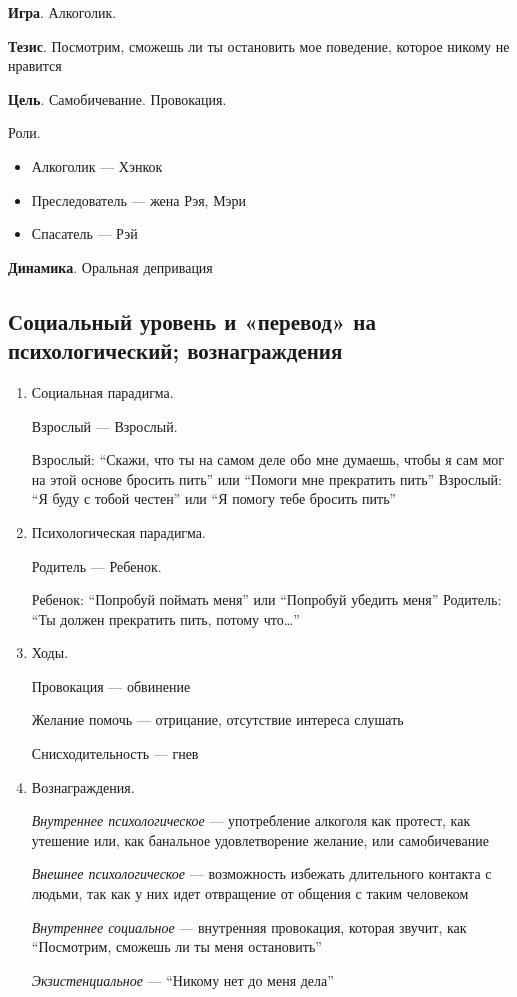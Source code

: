 \textbf{Игра}. Алкоголик.

\textbf{Тезис}. Посмотрим, сможешь ли ты остановить мое поведение, которое никому не нравится

\textbf{Цель}. Самобичевание. Провокация.

Роли.
\begin{itemize}
    \item Алкоголик — Хэнкок
    \item Преследователь — жена Рэя, Мэри
    \item Спасатель — Рэй
\end{itemize}

\textbf{Динамика}. Оральная депривация

\subsection*{Социальный уровень и «перевод» на психологический; вознаграждения}

\begin{enumerate}
    \item Социальная парадигма.
    
    Взрослый — Взрослый.
    
    Взрослый: “Скажи, что ты на самом деле обо мне думаешь, чтобы я сам мог на этой основе бросить пить” или “Помоги мне прекратить пить”
    Взрослый: “Я буду с тобой честен” или “Я помогу тебе бросить пить”
    
    \item Психологическая парадигма.
    
    Родитель — Ребенок.
    
    Ребенок: “Попробуй поймать меня” или “Попробуй убедить меня”
    Родитель: “Ты должен прекратить пить, потому что…”
    
    \item Ходы.
     
    Провокация — обвинение
    
    Желание помочь — отрицание, отсутствие интереса слушать 
    
    Снисходительность — гнев
    
    \item Вознаграждения.
    
    \textit{Внутреннее психологическое} — употребление алкоголя как протест, как утешение или, как банальное удовлетворение желание, или самобичевание
    
    \textit{Внешнее психологическое} — возможность избежать длительного контакта с людьми, так как у них идет отвращение от общения с таким человеком 
    
    \textit{Внутреннее социальное} — внутренняя провокация, которая звучит, как “Посмотрим, сможешь ли ты меня остановить”
    
    \textit{Экзистенциальное} — “Никому нет до меня дела”
\end{enumerate}

